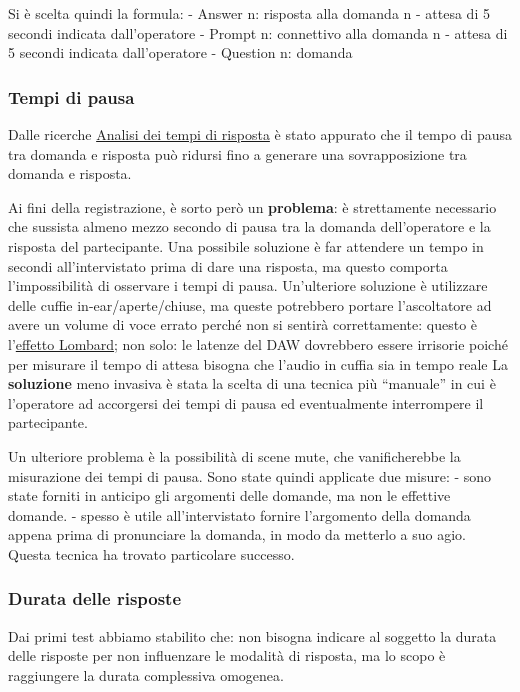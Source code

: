 \documentclass[
]{article}
\begin{document}
Si è scelta quindi la formula: - Answer n: risposta alla domanda n - attesa di 5 secondi indicata dall'operatore - Prompt n: connettivo alla domanda n - attesa di 5 secondi indicata dall'operatore - Question n: domanda

\subsubsection{Tempi di pausa}\label{tempi-di-pausa}

Dalle ricerche \hyperref[analisi-dei-tempi-di-risposta]{Analisi dei tempi di risposta} è stato appurato che il tempo di pausa tra domanda e risposta può ridursi fino a generare una sovrapposizione tra domanda e risposta.

Ai fini della registrazione, è sorto però un \textbf{problema}: è strettamente necessario che sussista almeno mezzo secondo di pausa tra la domanda dell'operatore e la risposta del partecipante. Una possibile soluzione è far attendere un tempo in secondi all'intervistato prima di dare una risposta, ma questo comporta l'impossibilità di osservare i tempi di pausa. Un'ulteriore soluzione è utilizzare delle cuffie in-ear/aperte/chiuse, ma queste potrebbero portare l'ascoltatore ad avere un volume di voce errato perché non si sentirà correttamente: questo è l'\hyperref[Effetto-Lombard-e-la-cuffia-nel-doppiaggio-per-una-voce-naturale]{effetto Lombard}; non solo: le latenze del DAW dovrebbero essere irrisorie poiché per misurare il tempo di attesa bisogna che l'audio in cuffia sia in tempo reale La \textbf{soluzione} meno invasiva è stata la scelta di una tecnica più ``manuale'' in cui è l'operatore ad accorgersi dei tempi di pausa ed eventualmente interrompere il partecipante.

Un ulteriore problema è la possibilità di scene mute, che vanificherebbe la misurazione dei tempi di pausa. Sono state quindi applicate due misure: - sono state forniti in anticipo gli argomenti delle domande, ma non le effettive domande. - spesso è utile all'intervistato fornire l'argomento della domanda appena prima di pronunciare la domanda, in modo da metterlo a suo agio. Questa tecnica ha trovato particolare successo.

\subsubsection{Durata delle risposte}\label{durata-delle-risposte}

Dai primi test abbiamo stabilito che: non bisogna indicare al soggetto la durata delle risposte per non influenzare le modalità di risposta, ma lo scopo è raggiungere la durata complessiva omogenea.
\end{document}
